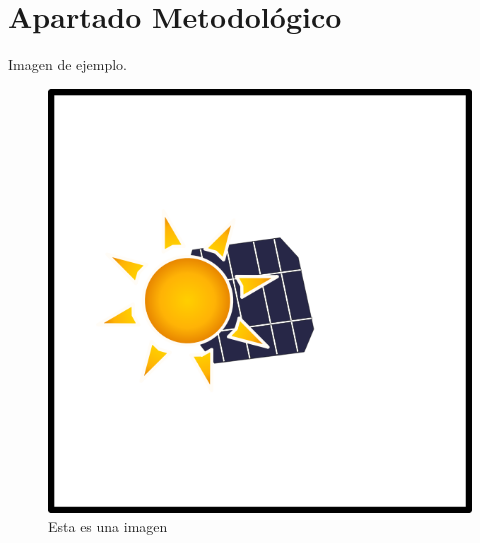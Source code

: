 \chapter{Apartado Metodológico}
\label{Apartado Metodológico}

Imagen de ejemplo.

\begin{figure}[H]
\begin{center}
\includegraphics[width=1\linewidth,frame]{imagenes/solar-icon.png}
\caption{Esta es una imagen}
\label{solaricon}
\end{center}
\end{figure}